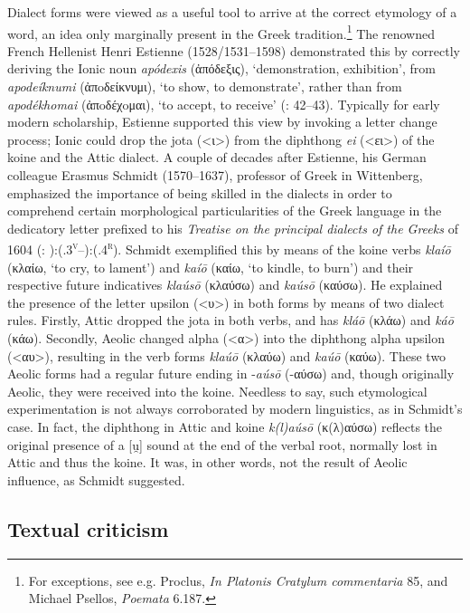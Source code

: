 Dialect forms were viewed as a useful tool to arrive at the correct etymology of a word, an idea only marginally present in the Greek tradition.\footnote{For exceptions, see e.g. Proclus, \textit{In Platonis Cratylum commentaria} 85, and Michael Psellos, \textit{Poemata} 6.187.} The renowned French Hellenist Henri Estienne (1528/1531–1598) demonstrated this by correctly deriving the Ionic noun \textit{apódexis} (ἀπόδεξις), ‘demonstration, exhibition’, from \textit{apodeíknumi} (ἀπoδείκνυμι), ‘to show, to demonstrate’, rather than from \textit{apodékhomai} (ἀπoδέχoμαι), ‘to accept, to receive’ (\citealt{Estienne1581}: 42–43). Typically for early modern scholarship, Estienne supported this view by invoking a letter change process; Ionic could drop the jota (<ι>) from the diphthong \textit{ei} (<ει>) of the koine and the Attic dialect. A couple of decades after Estienne, his German colleague Erasmus Schmidt (1570–1637), professor of Greek in Wittenberg, emphasized the importance of being skilled in the dialects in order to comprehend certain morphological particularities of the Greek language in the dedicatory letter prefixed to his \textit{Treatise on the principal dialects of the Greeks} of 1604 (\citealt{Schmidt1604}: ):(.3\textsc{\textsuperscript{v}}–):(.4\textsc{\textsuperscript{r}}). Schmidt exemplified this by means of the koine verbs \textit{klaíō} (κλαίω, ‘to cry, to lament’) and \textit{kaíō} (καίω, ‘to kindle, to burn’) and their respective future indicatives \textit{klaúsō} (κλαύσω) and \textit{kaúsō} (καύσω). He explained the presence of the letter upsilon (<υ>) in both forms by means of two dialect rules. Firstly, Attic dropped the jota in both verbs, and has \textit{kláō} (κλάω) and \textit{káō} (κάω). Secondly, Aeolic changed alpha (<α>) into the diphthong alpha upsilon (<αυ>), resulting in the verb forms \textit{klaúō} (κλαύω) and \textit{kaúō} (καύω). These two Aeolic forms had a regular future ending in -\textit{aúsō} (-αύσω) and, though originally Aeolic, they were received into the koine. Needless to say, such etymological experimentation is not always corroborated by modern linguistics, as in Schmidt’s case.{} In fact, the diphthong in Attic and koine \textit{k(l)aúsō} (κ(λ)αύσω) reflects the original presence of a [u̯] sound at the end of the verbal root, normally lost in Attic and thus the koine. It was, in other words, not the result of Aeolic influence, as Schmidt suggested.

\subsection{Textual criticism}

